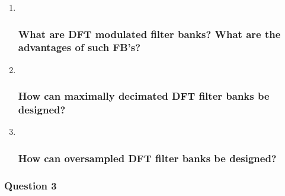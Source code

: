 \documentclass[
  a4paper,
  ,captions=tableheading
]{scrartcl}
\begin{document}
\begin{enumerate}
\def\labelenumi{\arabic{enumi}.}
\item ~
  \subsubsection{What are DFT modulated filter banks? What are the
  advantages of such
  FB's?}\label{what-are-dft-modulated-filter-banks-what-are-the-advantages-of-such-fbs-2}
\item ~
  \subsubsection{How can maximally decimated DFT filter banks be
  designed?}\label{how-can-maximally-decimated-dft-filter-banks-be-designed}
\item ~
  \subsubsection{How can oversampled DFT filter banks be
  designed?}\label{how-can-oversampled-dft-filter-banks-be-designed}
\end{enumerate}

\subsubsection{Question 3}\label{question-3-8}
\end{document}
